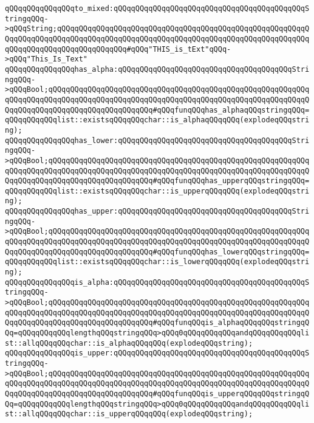 \verb|qQQqqQQqqQQqqQQqto_mixed:qQQqqQQqqQQqqQQqqQQqqQQqqQQqqQQqqQQqqQQqqQQqStringqQQq->qQQqString;qQQqqQQqqQQqqQQqqQQqqQQqqQQqqQQqqQQqqQQqqQQqqQQqqQQqqQQqqQQqqQQqqQQqqQQqqQQqqQQqqQQqqQQqqQQqqQQqqQQqqQQqqQQqqQQqqQQqqQQqqQQqqQQqqQQqqQQqqQQqqQQqqQQqqQQqqQQq#qQQq"THIS_is_tExt"qQQq->qQQq"This_Is_Text"|\newline
\newline
\verb|qQQqqQQqqQQqqQQqhas_alpha:qQQqqQQqqQQqqQQqqQQqqQQqqQQqqQQqqQQqqQQqStringqQQq->qQQqBool;qQQqqQQqqQQqqQQqqQQqqQQqqQQqqQQqqQQqqQQqqQQqqQQqqQQqqQQqqQQqqQQqqQQqqQQqqQQqqQQqqQQqqQQqqQQqqQQqqQQqqQQqqQQqqQQqqQQqqQQqqQQqqQQqqQQqqQQqqQQqqQQqqQQqqQQqqQQqqQQqqQQq#qQQqfunqQQqhas_alphaqQQqstringqQQq=qQQqqQQqqQQqlist::existsqQQqqQQqchar::is_alphaqQQqqQQq(explodeqQQqstring);|\newline
\verb|qQQqqQQqqQQqqQQqhas_lower:qQQqqQQqqQQqqQQqqQQqqQQqqQQqqQQqqQQqqQQqStringqQQq->qQQqBool;qQQqqQQqqQQqqQQqqQQqqQQqqQQqqQQqqQQqqQQqqQQqqQQqqQQqqQQqqQQqqQQqqQQqqQQqqQQqqQQqqQQqqQQqqQQqqQQqqQQqqQQqqQQqqQQqqQQqqQQqqQQqqQQqqQQqqQQqqQQqqQQqqQQqqQQqqQQqqQQqqQQq#qQQqfunqQQqhas_upperqQQqstringqQQq=qQQqqQQqqQQqlist::existsqQQqqQQqchar::is_upperqQQqqQQq(explodeqQQqstring);|\newline
\verb|qQQqqQQqqQQqqQQqhas_upper:qQQqqQQqqQQqqQQqqQQqqQQqqQQqqQQqqQQqqQQqStringqQQq->qQQqBool;qQQqqQQqqQQqqQQqqQQqqQQqqQQqqQQqqQQqqQQqqQQqqQQqqQQqqQQqqQQqqQQqqQQqqQQqqQQqqQQqqQQqqQQqqQQqqQQqqQQqqQQqqQQqqQQqqQQqqQQqqQQqqQQqqQQqqQQqqQQqqQQqqQQqqQQqqQQqqQQqqQQq#qQQqfunqQQqhas_lowerqQQqstringqQQq=qQQqqQQqqQQqlist::existsqQQqqQQqchar::is_lowerqQQqqQQq(explodeqQQqstring);|\newline
\newline
\verb|qQQqqQQqqQQqqQQqis_alpha:qQQqqQQqqQQqqQQqqQQqqQQqqQQqqQQqqQQqqQQqqQQqStringqQQq->qQQqBool;qQQqqQQqqQQqqQQqqQQqqQQqqQQqqQQqqQQqqQQqqQQqqQQqqQQqqQQqqQQqqQQqqQQqqQQqqQQqqQQqqQQqqQQqqQQqqQQqqQQqqQQqqQQqqQQqqQQqqQQqqQQqqQQqqQQqqQQqqQQqqQQqqQQqqQQqqQQqqQQqqQQq#qQQqfunqQQqis_alphaqQQqqQQqstringqQQq=qQQqqQQqqQQqlengthqQQqstringqQQq>qQQq0qQQqqQQqqQQqandqQQqqQQqqQQqlist::allqQQqqQQqchar::is_alphaqQQqqQQq(explodeqQQqstring);|\newline
\verb|qQQqqQQqqQQqqQQqis_upper:qQQqqQQqqQQqqQQqqQQqqQQqqQQqqQQqqQQqqQQqqQQqStringqQQq->qQQqBool;qQQqqQQqqQQqqQQqqQQqqQQqqQQqqQQqqQQqqQQqqQQqqQQqqQQqqQQqqQQqqQQqqQQqqQQqqQQqqQQqqQQqqQQqqQQqqQQqqQQqqQQqqQQqqQQqqQQqqQQqqQQqqQQqqQQqqQQqqQQqqQQqqQQqqQQqqQQqqQQqqQQq#qQQqfunqQQqis_upperqQQqqQQqstringqQQq=qQQqqQQqqQQqlengthqQQqstringqQQq>qQQq0qQQqqQQqqQQqandqQQqqQQqqQQqlist::allqQQqqQQqchar::is_upperqQQqqQQq(explodeqQQqstring);|\newline
